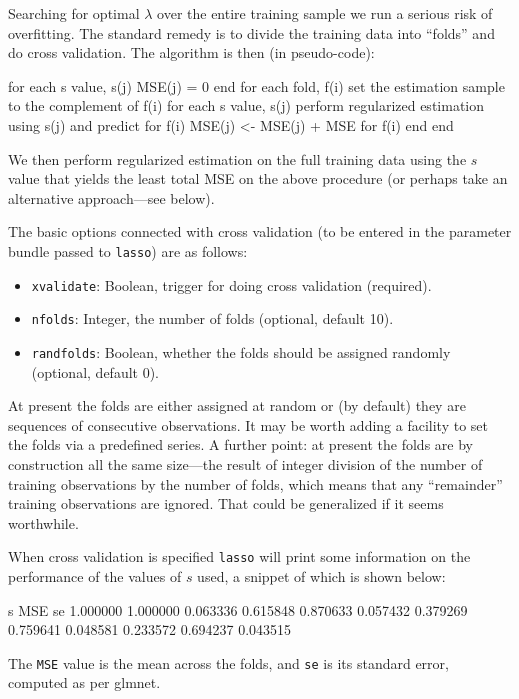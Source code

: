 \documentclass{article}
\begin{document}
Searching for optimal $\lambda$ over the entire training sample we run
a serious risk of overfitting. The standard remedy is to divide the
training data into ``folds'' and do cross validation. The algorithm is
then (in pseudo-code):
\begin{code}
for each s value, s(j)
  MSE(j) = 0
end
for each fold, f(i)
  set the estimation sample to the complement of f(i)
  for each s value, s(j)
    perform regularized estimation using s(j) and predict for f(i)
    MSE(j) <- MSE(j) + MSE for f(i)
  end
end
\end{code}
We then perform regularized estimation on the full training data using the
$s$ value that yields the least total MSE on the above procedure (or
perhaps take an alternative approach---see below).

The basic options connected with cross validation (to be entered in
the parameter bundle passed to \texttt{lasso}) are as follows:
\begin{itemize}
\item \texttt{xvalidate}: Boolean, trigger for doing cross validation (required).
\item \texttt{nfolds}: Integer, the number of folds (optional, default
  10).
\item \texttt{randfolds}: Boolean, whether the folds should be
  assigned randomly (optional, default 0).
\end{itemize}

At present the folds are either assigned at random or (by default)
they are sequences of consecutive observations. It may be worth adding
a facility to set the folds via a predefined series. A further point:
at present the folds are by construction all the same size---the
result of integer division of the number of training observations by
the number of folds, which means that any ``remainder'' training
observations are ignored. That could be generalized if it seems
worthwhile.

When cross validation is specified \texttt{lasso} will print some
information on the performance of the values of $s$ used, a
snippet of which is shown below:
\begin{code}
          s        MSE         se
   1.000000   1.000000   0.063336
   0.615848   0.870633   0.057432
   0.379269   0.759641   0.048581
   0.233572   0.694237   0.043515
\end{code}
The \texttt{MSE} value is the mean across the folds, and \texttt{se}
is its standard error, computed as per \textsf{glmnet}.
\end{document}
